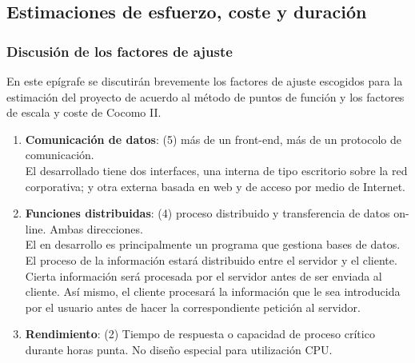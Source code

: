 \documentclass[11pt, a4paper, twoside, titlepage]{article}
\begin{document}
		\subsection{Estimaciones de esfuerzo, coste y duración}
			\subsubsection{Discusión de los factores de ajuste} \label{estimac:factores}
				En este epígrafe se discutirán brevemente los factores de ajuste escogidos para la estimación del proyecto de acuerdo al método de puntos de función y los factores de escala y coste de Cocomo II.

				\begin{enumerate}
					\item \textbf{Comunicación de datos}: (5) más de un front-end, más de un protocolo de comunicación.\\
						El \software desarrollado tiene dos interfaces, una interna de tipo escritorio sobre la
					red corporativa; y otra externa basada en web y de acceso por medio de Internet.

					\item \textbf{Funciones distribuidas}: (4) proceso distribuido y transferencia de datos on-line. Ambas direcciones.\\
						El \software en desarrollo es principalmente un programa que gestiona bases de datos. El proceso de la información estará distribuido entre el servidor y el cliente. Cierta información será procesada por el servidor antes de ser enviada al cliente. Así mismo, el cliente procesará la información que le sea introducida por el usuario antes de hacer la correspondiente petición al servidor.

					\item \textbf{Rendimiento}: (2) Tiempo de respuesta o capacidad de proceso crítico durante horas punta.
No diseño especial para utilización CPU.
	

\end{enumerate}
\end{document}
